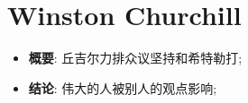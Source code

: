 \section{Winston Churchill}

  \begin{itemize}
    \item \textbf{概要}: 丘吉尔力排众议坚持和希特勒打;
    \item \textbf{结论}: 伟大的人被别人的观点影响;
  \end{itemize}

